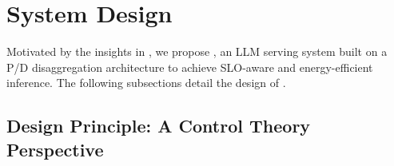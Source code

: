 \section{System Design}
\label{sec:design}

Motivated by the insights in , we propose \name, an LLM serving system built on a P/D disaggregation architecture to achieve SLO-aware and energy-efficient inference.
The following subsections detail the design of \name.



\subsection{Design Principle: A Control Theory Perspective}
\label{subsec:control}




